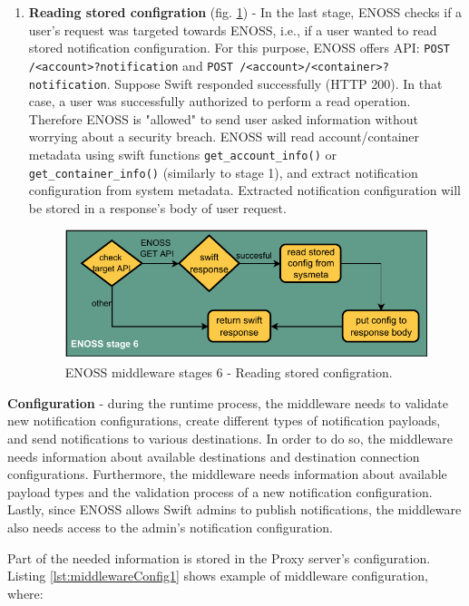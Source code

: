 \begin{enumerate}
        \item \textbf{Reading stored configration} (fig. \ref{fig:enoss-stage6}) - In the last stage, ENOSS checks if a user's request was targeted towards ENOSS, i.e., if a user wanted to read stored notification configuration. For this purpose, ENOSS offers API: \texttt{POST /<account>?notification} and \texttt{POST /<account>/<container>?notification}. Suppose Swift responded successfully (HTTP 200). In that case, a user was successfully authorized to perform a read operation. Therefore ENOSS is "allowed" to send user asked information without worrying about a security breach. ENOSS will read account/container metadata using swift functions \texttt{get\_account\_info()} or \texttt{get\_container\_info()} (similarly to stage 1), and extract notification configuration from system metadata. Extracted notification configuration will be stored in a response's body of user request.

        \begin{figure}[H]
            \centering
            \includegraphics[width=1\textwidth]{obrazky-figures/enoss-stage6.pdf}
            \caption{ENOSS middleware stages 6 - Reading stored configration.}
            \label{fig:enoss-stage6}
        \end{figure}
    \end{enumerate}

    \textbf{Configuration} - during the runtime process, the middleware needs to validate new notification configurations, create different types of notification payloads, and send notifications to various destinations. In order to do so, the middleware needs information about available destinations and destination connection configurations. Furthermore, the middleware needs information about available payload types and the validation process of a new notification configuration. Lastly, since ENOSS allows Swift admins to publish notifications, the middleware also needs access to the admin's notification configuration.

    Part of the needed information is stored in the Proxy server's configuration. Listing \ref{lst:middlewareConfig1} shows example of middleware configuration, where:


